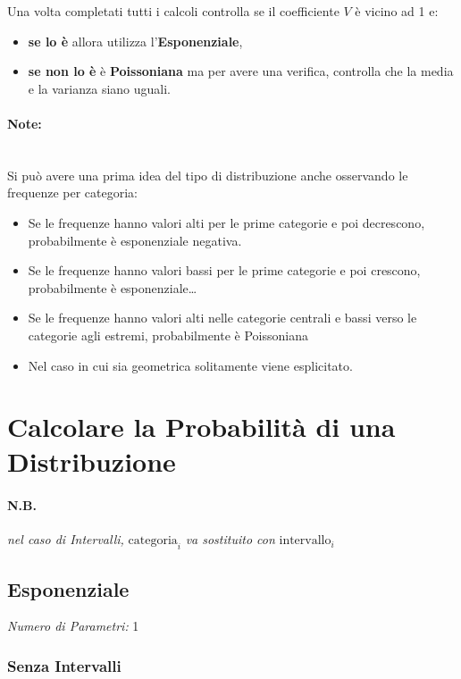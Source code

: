 Una volta completati tutti i calcoli controlla se il coefficiente $V$ è vicino
ad 1 e:
\begin{itemize}
      \item \textbf{se lo è} allora utilizza l'\textbf{Esponenziale},
      \item \textbf{se non lo è} è \textbf{Poissoniana} ma per avere una verifica,
            controlla che la media e la varianza siano uguali.
\end{itemize}

\paragraph{Note:}\ \\
Si può avere una prima idea del tipo di distribuzione anche
osservando le frequenze per categoria:
\begin{itemize}
      \item Se le frequenze hanno valori alti per le prime categorie e poi
            decrescono, probabilmente è esponenziale negativa.
      \item Se le frequenze hanno valori bassi per le prime categorie e poi
            crescono, probabilmente è esponenziale\dots
      \item Se le frequenze hanno valori alti nelle categorie centrali e bassi
            verso le categorie agli estremi, probabilmente è Poissoniana
      \item Nel caso in cui sia geometrica solitamente viene esplicitato.
\end{itemize}

\section{Calcolare la Probabilità di una Distribuzione} \label{pi}

\paragraph{N.B.} \textit{nel caso di Intervalli,} $\text{categoria}_i$ \textit{va sostituito con}
$\text{intervallo}_i$

\subsection{Esponenziale}

\textit{Numero di Parametri:} 1

\subsubsection{Senza Intervalli}

